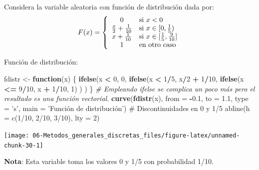 \documentclass[]{book}
\newenvironment{Shaded}{\begin{snugshade}}{\end{snugshade}}
\newcommand{\KeywordTok}[1]{\textcolor[rgb]{0.13,0.29,0.53}{\textbf{#1}}}
\newcommand{\DataTypeTok}[1]{\textcolor[rgb]{0.13,0.29,0.53}{#1}}
\newcommand{\DecValTok}[1]{\textcolor[rgb]{0.00,0.00,0.81}{#1}}
\newcommand{\FloatTok}[1]{\textcolor[rgb]{0.00,0.00,0.81}{#1}}
\newcommand{\StringTok}[1]{\textcolor[rgb]{0.31,0.60,0.02}{#1}}
\newcommand{\CommentTok}[1]{\textcolor[rgb]{0.56,0.35,0.01}{\textit{#1}}}
\newcommand{\ControlFlowTok}[1]{\textcolor[rgb]{0.13,0.29,0.53}{\textbf{#1}}}
\newcommand{\OperatorTok}[1]{\textcolor[rgb]{0.81,0.36,0.00}{\textbf{#1}}}
\newcommand{\NormalTok}[1]{#1}
\theoremstyle{definition}
\theoremstyle{definition}
\theoremstyle{definition}
\theoremstyle{remark}
\let\BeginKnitrBlock\begin \let\EndKnitrBlock\end
\begin{document}
\BeginKnitrBlock{exercise}
\protect\hypertarget{exr:unnamed-chunk-29}{}{\label{exr:unnamed-chunk-29} }
\EndKnitrBlock{exercise}

Considera la variable aleatoria con función de distribución dada por:
\[F(x)=\left\{
\begin{array}
[c]{cl}0 & \mbox{si $x<0$}\\
\frac{x}{2}+\frac{1}{10} & \mbox{si $x\in[0,\frac{1}{5})$}\\
x+\frac{1}{10} & \mbox{si $x\in[\frac{1}{5},\frac{9}{10}]$}\\
1 & \mbox{en otro caso}
\end{array}
\right.\]

Función de distribución:

\begin{Shaded}
\begin{Highlighting}[]
\NormalTok{fdistr <-}\StringTok{ }\ControlFlowTok{function}\NormalTok{(x) \{}
\KeywordTok{ifelse}\NormalTok{(x }\OperatorTok{<}\StringTok{ }\DecValTok{0}\NormalTok{, }\DecValTok{0}\NormalTok{,}
    \KeywordTok{ifelse}\NormalTok{(x }\OperatorTok{<}\StringTok{ }\DecValTok{1}\OperatorTok{/}\DecValTok{5}\NormalTok{, x}\OperatorTok{/}\DecValTok{2} \OperatorTok{+}\StringTok{ }\DecValTok{1}\OperatorTok{/}\DecValTok{10}\NormalTok{,}
        \KeywordTok{ifelse}\NormalTok{(x }\OperatorTok{<=}\StringTok{ }\DecValTok{9}\OperatorTok{/}\DecValTok{10}\NormalTok{, x }\OperatorTok{+}\StringTok{ }\DecValTok{1}\OperatorTok{/}\DecValTok{10}\NormalTok{, }\DecValTok{1}\NormalTok{) ) )}
\NormalTok{\}}
\CommentTok{# Empleando ifelse se complica un poco más pero el resultado es una función vectorial.}
\KeywordTok{curve}\NormalTok{(}\KeywordTok{fdistr}\NormalTok{(x), }\DataTypeTok{from =} \OperatorTok{-}\FloatTok{0.1}\NormalTok{, }\DataTypeTok{to =} \FloatTok{1.1}\NormalTok{, }\DataTypeTok{type =} \StringTok{'s'}\NormalTok{, }
      \DataTypeTok{main =} \StringTok{'Función de distribución')}
\StringTok{# Discontinuidades en 0 y 1/5}
\StringTok{abline(h = c(1/10, 2/10, 3/10), lty = 2) }
\end{Highlighting}
\end{Shaded}

\begin{center}\texttt{[image: 06-Metodos\_generales\_discretas\_files/figure-latex/unnamed-chunk-30-1]} \end{center}

\textbf{Nota}: Esta variable toma los valores 0 y 1/5 con probabilidad
1/10.
\end{document}

